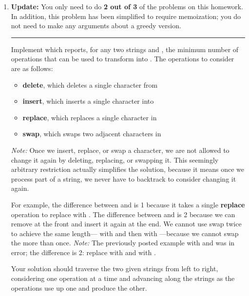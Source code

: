 \documentclass{article}
\begin{document}
\begin{enumerate}

  \newpage
  \item

    \noindent\textbf{Update:} You only need to do \textbf{2 out of 3} of the
    problems on this homework.  In addition, this problem has been simplified to
    require memoization; you do not need to make any arguments about a greedy
    version.

    \rule{\linewidth}{1pt}

    Implement  which reports, for any two strings
     and , the minimum number of operations that can be used
    to transform  into .  The operations to consider are as
    follows:
    \begin{itemize}
    \item \textbf{delete}, which deletes a single character from 
    \item \textbf{insert}, which inserts a single character into 
    \item \textbf{replace}, which replaces a single character in 
    \item \textbf{swap}, which swaps two adjacent characters in 
    \end{itemize}
    \emph{Note:} Once we insert, replace, or swap a character, we are not
    allowed to change it again by deleting, replacing, or swapping it.  This
    seemingly arbitrary restriction actually simplifies the solution, because it
    means once we process part of a string, we never have to backtrack to
    consider changing it again.

    For example, the difference between  and  is 1
    because it takes a single \textbf{replace} operation to replace 
    with .  The difference between  and  is 2
    because we can remove  at the front and insert it again at the
    end.  We cannot use swap twice to achieve the same length--- with
     and then  with ---because we cannot swap the
     more than once.  \emph{Note:} The previously
    posted example with  and  was in error; the
    difference is 2: replace  with  and  with
    .

    Your solution should traverse the two given strings from left to right,
    considering one operation at a time and advancing along the strings as the
    operations use up one and produce the other.


\end{enumerate}
\end{document}
